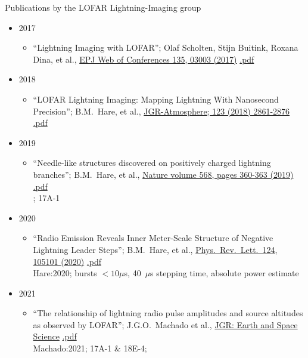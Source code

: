 \documentclass[fleqn,11pt]{article}
\begin{document}
{\Large Publications by the LOFAR Lightning-Imaging group}

\begin{itemize}
\item{2017}
\begin{itemize}
\item ``Lightning Imaging with LOFAR''; Olaf Scholten, Stijn Buitink, Roxana Dina, et al.,
 \href{https://doi.org/10.1051/epjconf/201713503003}{EPJ Web of Conferences 135, 03003 (2017)}
\href{https://www.epj-conferences.org/articles/epjconf/pdf/2017/04/epjconf_arena2017_03003.pdf}{.pdf}
\end{itemize}

\item{2018}
\begin{itemize}
\item ``LOFAR Lightning Imaging: Mapping Lightning With Nanosecond Precision''; B.M.\ Hare, et al.,
 \href{https://doi.org/10.1002/2017JD028132}{JGR-Atmosphere; 123 (2018) 2861-2876}
\href{https://drive.google.com/file/d/1vezngJcZ61hRrt8Tcy9CnP_zXdV4bjua/view?usp=sharing}{.pdf}
\end{itemize}

\item{2019}
\begin{itemize}
\item ``Needle-like structures discovered on positively charged lightning branches''; B.M.\ Hare, et al.,
 \href{https://doi.org/10.1038/s41586-019-1086-6}{Nature volume 568, pages 360-363 (2019)}
\href{https://drive.google.com/file/d/13ZQhrlQCmd03sfZ765F3xytzUnJzobnH/view?usp=sharing}{.pdf}
\\ ; 17A-1
\end{itemize}

\item{2020}
\begin{itemize}
\item ``Radio Emission Reveals Inner Meter-Scale Structure of Negative Lightning Leader Steps''; B.M.\ Hare, et al.,
 \href{https://doi.org/10.1103/PhysRevLett.124.105101}{Phys.\ Rev.\ Lett.\ 124, 105101 (2020)}
\href{https://drive.google.com/file/d/1KHlmFhRyaO-jcH-ZWVmEFVZMldi75vc7/view?usp=sharing}{.pdf}
\\Hare:2020; bursts $<10\mu$s, 40~$\mu$s stepping time, absolute power estimate
\end{itemize}


\item{2021}
\begin{itemize}
\item ``The relationship of lightning radio pulse amplitudes and source altitudes as observed by LOFAR''; J.G.O.\ Machado et al.,
 \href{https://doi.org/10.1029/2021EA001958}{JGR: Earth and Space Science}
\href{https://drive.google.com/file/d/19CIRVmTa6FGWF4RwcSvupHWzvTjZF5Lv/view?usp=sharing}{.pdf}
\\Machado:2021; 17A-1 \& 18E-4;


\end{itemize}
\end{itemize}
\end{document}
